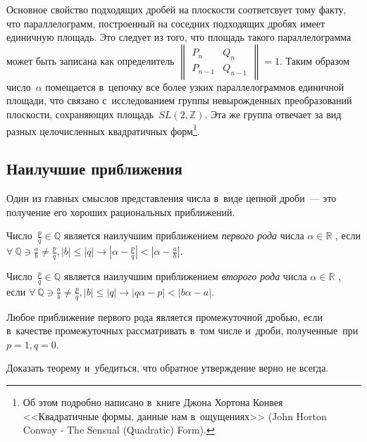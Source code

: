 \documentclass{article}
\begin{document}
Основное свойство подходящих дробей на плоскости соответсвует тому факту, что
параллелограмм, построенный на соседних подходящих дробях имеет единичную
площадь. Это следует из того, что площадь такого параллелограмма может быть
записана как определитель $\begin{Vmatrix} P_n & Q_n \\ P_{n-1} & Q_{n - 1}
\end{Vmatrix} = 1$. Таким образом число~$\alpha$ помещается в~цепочку все более
узких параллелограммов единичной площади, что связано с~исследованием группы
невырожденных преобразований плоскости, сохраняющих площадь~$SL(2, \mathbb{Z})$.
Эта же группа отвечает за вид разных целочисленных квадратичных
форм\footnote{Об этом подробно написано в~книге Джона Хортона Конвея
<<Квадратичные формы, данные нам в~ощущениях>> (John Horton Conway - The Sensual
(Quadratic) Form).}.

\subsection{Наилучшие приближения}

Один из главных смыслов представления числа в~виде цепной дроби~--- это
получение его хороших рациональных приближений.

\begin{definition}
  Число~$\frac{p}{q} \in \mathbb{Q}$ является наилучшим приближением
  \emph{первого рода} числа $\alpha \in \mathbb{R}$ , если $\forall~\mathbb{Q}
  \ni \frac{a}{b} \ne \frac{p}{q}, |b| \le |q| \rightarrow \left| \alpha -
  \frac{p}{q} \right| < \left| \alpha - \frac{a}{b} \right|$.
\end{definition}

\begin{definition}
  Число~$\frac{p}{q} \in \mathbb{Q}$ является наилучшим приближением
  \emph{второго рода} числа $\alpha \in \mathbb{R}$ , если $\forall~\mathbb{Q}
  \ni \frac{a}{b} \ne \frac{p}{q}, |b| \le |q| \rightarrow \left| q\alpha - p
  \right| < \left| b\alpha - a \right|$.
\end{definition}

\begin{theorem}
  Любое приближение первого рода является промежуточной дробью, если в~качестве
  промежуточных рассматривать в~том числе и~дроби, полученные~при $p = 1, q =
  0$.
\end{theorem}
\begin{exercise}
  Доказать теорему и~убедиться, что обратное утверждение верно не всегда.
\end{exercise}
\end{document}
